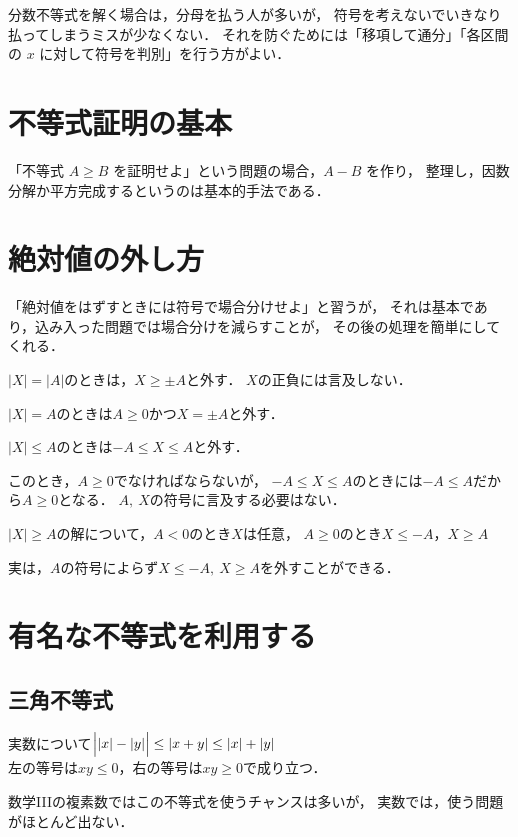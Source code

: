 \documentclass[twocolumn]{ltjsarticle}
\begin{document}
分数不等式を解く場合は，分母を払う人が多いが，
符号を考えないでいきなり払ってしまうミスが少なくない．
それを防ぐためには「移項して通分」「各区間の $x$ に対して符号を判別」を行う方がよい．


\section{不等式証明の基本}\label{sec:basis-ineq}
「不等式 $A\geq B$ を証明せよ」という問題の場合，$A-B$ を作り，
整理し，因数分解か平方完成するというのは基本的手法である．

\section{絶対値の外し方}\label{sec:how-to-getridof-abs}
「絶対値をはずすときには符号で場合分けせよ」と習うが，
それは基本であり，込み入った問題では場合分けを減らすことが，
その後の処理を簡単にしてくれる．

\begin{lineup}
  $|X| = |A|$のときは，$X\geq \pm A$と外す．
  $X$の正負には言及しない．

  $|X| = A$のときは$A\geq 0$かつ$X = \pm A$と外す．
\end{lineup}

\begin{lineup}
  $|X|\leq A$のときは$-A\leq X\leq A$と外す．

  このとき，$A\geq 0$でなければならないが，
  $-A\leq X\leq A$のときには$-A\leq A$だから$A\geq 0$となる．
  $A,\:X$の符号に言及する必要はない．
\end{lineup}

\begin{lineup}
  $|X|\geq A$の解について，$A<0$のとき$X$は任意，
  $A\geq 0$のとき$X\leq -A$，$X\geq A$

  実は，$A$の符号によらず$X\leq -A,\:X\geq A$を外すことができる．
\end{lineup}

\section{有名な不等式を利用する}\label{sec:use-famous-ineqs}
\subsection{三角不等式}

\begin{lineup}
  実数について$\Bigl||x|-|y|\Bigr|\leq |x+y|\leq |x|+|y|$\\
  左の等号は$xy\leq 0$，右の等号は$xy\geq 0$で成り立つ．

  数学IIIの複素数ではこの不等式を使うチャンスは多いが，
  実数では，使う問題がほとんど出ない．\\
\end{lineup}
\end{document}
